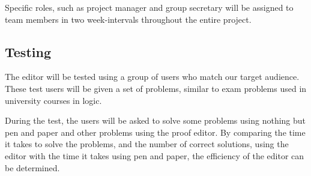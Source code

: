 Specific roles, such as project manager and group secretary will be assigned to team members in two week-intervals throughout the entire project.

\subsection{Testing}
The editor will be tested using a group of users who match our target audience. These test users will be given a set of problems, similar to exam problems used in university courses in logic.

During the test, the users will be asked to solve some problems using nothing
but pen and paper and other problems using the proof editor. By comparing the
time it takes to solve the problems, and the number of correct solutions,  using the editor with the time it takes using pen and paper, the efficiency of the editor can be determined.